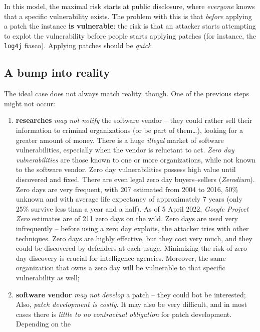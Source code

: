\documentclass[10pt]{extbook}
\begin{document}
In this model, the maximal risk starts at public disclosure, where
\emph{everyone} knows that a specific vulnerability exists. The problem with
this is that \emph{before} applying a patch the instance \textbf{is
vulnerable}: the risk is that an attacker starts attempting to explot the
vulnerability before people starts applying patches (for instance, the
\texttt{log4j} fiasco). Applying patches should be \emph{quick}.

\subsection{A bump into reality}

The ideal case does not always match reality, though. One of the previous steps
might not occur:
\begin{enumerate}
    \item \textbf{researches} \emph{may not notify} the software vendor -- they
        could rather sell their information to criminal organizations (or be
        part of them\dots), looking for a greater amount of money. There is a
        huge \emph{illegal} market of software vulnerabilities, especially when
        the vendor is reluctant to act. \emph{Zero day vulnerabilities} are
        those known to one or more organizations, while not known to the
        software vendor. Zero day vulnerabilities possess high value until
        discovered and fixed. There are even legal zero day buyers--sellers
        (\emph{Zerodium}). Zero days are very frequent, with 207 estimated from
        2004 to 2016, 50\% unknown and with average life expectancy of
        approximately 7 years (only 25\% survive less than a year and a half).
        As of 5 April 2022, \emph{Google Project Zero} estimates are of 211
        zero days on the wild. Zero days are used very infrequently -- before
        using a zero day exploits, the attacker tries with other techniques.
        Zero days are highly effective, but they cost very much, and they could
        be discovered by defenders at each usage. Minimizing the risk of zero
        day discovery is crucial for intelligence agencies. Moreover, the same
        organization that owns a zero day will be vulnerable to that specific
        vulnerability as well;
    \item \textbf{software vendor} \emph{may not develop} a patch -- they could
        bot be interested; Also, \emph{patch development is costly}. It may
        also be very difficult, and in most cases there is \emph{little to no
        contractual obligation} for patch development. Depending on the

\end{enumerate}
\end{document}
